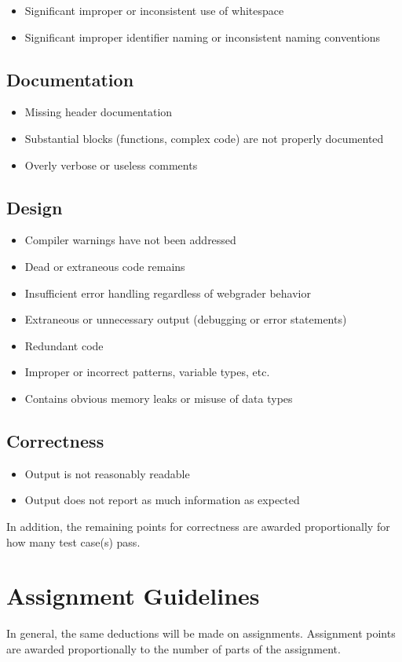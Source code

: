 \documentclass[12pt]{scrartcl}
\begin{document}
\begin{itemize}
  \item Significant improper or inconsistent use of whitespace
  \item Significant improper identifier naming or inconsistent naming conventions
\end{itemize}

\subsection*{Documentation}

\begin{itemize}
  \item Missing header documentation
  \item Substantial blocks (functions, complex code) are not properly documented
  \item Overly verbose or useless comments
\end{itemize}
 
\subsection*{Design}

\begin{itemize}
  \item Compiler warnings have not been addressed
  \item Dead or extraneous code remains
  \item Insufficient error handling regardless of webgrader behavior
  \item Extraneous or unnecessary output (debugging or error statements)
  \item Redundant code
  \item Improper or incorrect patterns, variable types, etc.
  \item Contains obvious memory leaks or misuse of data types          
\end{itemize}

\subsection*{Correctness}

\begin{itemize}
  \item Output is not reasonably readable
  \item Output does not report as much information as expected
\end{itemize}

In addition, the remaining points for correctness are awarded 
proportionally for how many test case(s) pass.
  
\section*{Assignment Guidelines}

In general, the same deductions will be made on assignments.  
Assignment points are awarded proportionally to the number of 
parts of the assignment.
\end{document}
